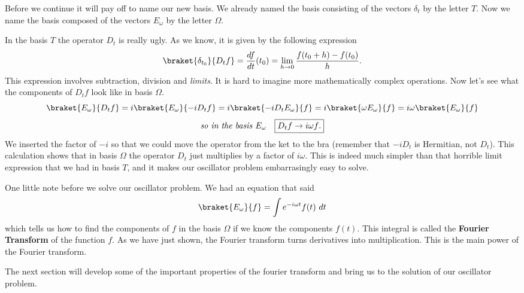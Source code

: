 Before we continue it will pay off to name our new basis.  We already named the basis consisting of the vectors $\delta_{t}$ by the letter $T$.  Now we name the basis composed of the vectors $E_\omega$ by the letter $\Omega$.

In the basis $T$ the operator $D_t$ is really ugly.  As we know, it is given by the following expression
\begin{displaymath} \braket{\delta_{t_0}}{D_tf} = \frac{df}{dt}(t_0) = \lim_{h \to 0} \frac{f(t_0+h) - f(t_0)}{h}. \end{displaymath}
This expression involves subtraction, division and \emph{limits}.  It is hard to imagine more mathematically complex operations.  Now let's see what the components of $D_tf$ look like in basis $\Omega$.
\begin{displaymath} \braket{E_\omega}{D_tf} = i\braket{E_\omega}{-iD_tf} = i\braket{-iD_tE_\omega}{f} = i\braket{\omega E_\omega}{f} = i\omega \braket{E_\omega}{f} \end{displaymath}
\begin{displaymath} \textrm{\emph{so in the basis}}~E_\omega \quad \framebox{$D_tf \rightarrow i\omega f$.} \end{displaymath}
We inserted the factor of $-i$ so that we could move the operator from the ket to the bra (remember that $-iD_t$ is Hermitian, not $D_t$).  This calculation shows that in basis $\Omega$ the operator $D_t$ just multiplies by a factor of $i\omega$.  This is indeed much simpler than that horrible limit expression that we had in basis $T$, and it makes our oscillator problem embarrasingly easy to solve.

One little note before we solve our oscillator problem.  We had an equation that said
\begin{displaymath} \braket{E_\omega}{f} = \int e^{-i\omega t} f(t)~dt \end{displaymath}
which tells us how to find the components of $f$ in the basis $\Omega$ if we know the components $f(t)$.  This integral is called the \textbf{Fourier Transform} of the function $f$.  As we have just shown, the Fourier transform turns derivatives into multiplication.  This is the main power of the Fourier transform.

The next section will develop some of the important properties of the fourier transform and bring us to the solution of our oscillator problem.
